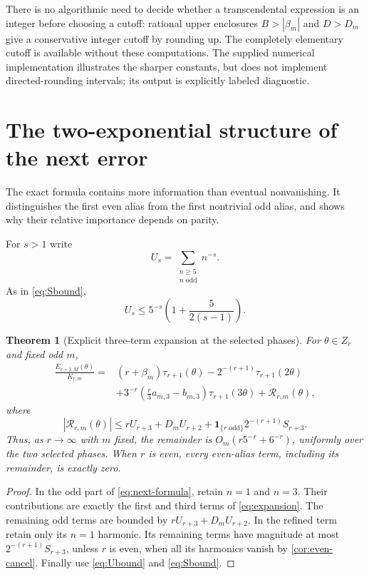 \documentclass[11pt,a4paper]{article}
\numberwithin{equation}{section}
\theoremstyle{plain}
\newtheorem{theorem}{Theorem}[section]
\theoremstyle{definition}
\theoremstyle{remark}
\begin{document}
There is no algorithmic need to decide whether a transcendental expression
is an integer before choosing a cutoff: rational upper enclosures
$B>|\beta_m|$ and $D>D_m$ give a conservative integer cutoff by rounding
up. The completely elementary cutoff is available without these
computations. The supplied numerical implementation illustrates the
sharper constants, but does not implement directed-rounding intervals;
its output is explicitly labeled diagnostic.

\section{The two-exponential structure of the next error}
\label{sec:asymptotic}

The exact formula contains more information than eventual nonvanishing.
It distinguishes the first even alias from the first nontrivial odd
alias, and shows why their relative importance depends on parity.

For $s>1$ write
\[
 U_s=\sum_{\substack{n\ge5\\n\text{ odd}}}n^{-s}.
\]
As in \eqref{eq:Sbound},
\begin{equation}\label{eq:Ubound}
 U_s\le5^{-s}\left(1+\frac5{2(s-1)}\right).
\end{equation}

\begin{theorem}[Explicit three-term expansion at the selected phases]
\label{thm:expansion}
For $\theta\in Z_r$ and fixed odd $m$,
\begin{align}
 \frac{E_{r+1,M}(\theta)}{K_{r,m}}
 ={}&(r+\beta_m)\tau_{r+1}(\theta)
       -2^{-(r+1)}\tau_{r+1}(2\theta)\nonumber\\
 &+3^{-r}\left(\frac r3a_{m,3}-b_{m,3}\right)
              \tau_{r+1}(3\theta)+\mathcal R_{r,m}(\theta),
 \label{eq:expansion}
\end{align}
where
\begin{equation}\label{eq:expansion-remainder}
 |\mathcal R_{r,m}(\theta)|
 \le rU_{r+3}+D_mU_{r+2}
 +\mathbf1_{\{r\text{ odd}\}}2^{-(r+1)}S_{r+3}.
\end{equation}
Thus, as $r\to\infty$ with $m$ fixed, the remainder is
$O_m(r5^{-r}+6^{-r})$, uniformly over the two selected phases.
When $r$ is even, every even-alias term, including its remainder, is
exactly zero.
\end{theorem}
\begin{proof}
In the odd part of \eqref{eq:next-formula}, retain $n=1$ and $n=3$.
Their contributions are exactly the first and third terms of
\eqref{eq:expansion}. The remaining odd terms are bounded by
$rU_{r+3}+D_mU_{r+2}$. In the refined term retain only its $n=1$
harmonic. Its remaining terms have magnitude at most
$2^{-(r+1)}S_{r+3}$, unless $r$ is even, when all its harmonics vanish
by \cref{cor:even-cancel}. Finally use \eqref{eq:Ubound} and
\eqref{eq:Sbound}.
\end{proof}
\end{document}
